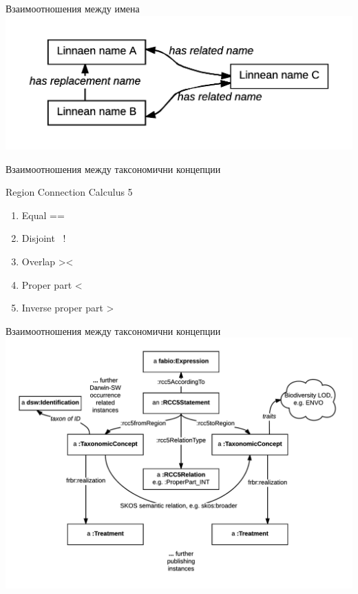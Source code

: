 \documentclass[bulgarian]{beamer}
\begin{document}
\begin{frame}{Взаимоотношения между имена}
 \centering
  \includegraphics[width=\textwidth]{Figures/scientific-name-patterns}
  \decoRule
  
\end{frame}

{

}




\begin{frame}{Взаимоотношения между таксономични концепции}

Region Connection Calculus 5
\begin{enumerate}
    \item Equal ==    
    \item Disjoint ~!
    \item Overlap   ><
    \item Proper part  <
    \item Inverse proper part >
\end{enumerate}

\end{frame}


\begin{frame}{Взаимоотношения между таксономични концепции}
\centering
  \includegraphics[width=\textwidth]{Figures/taxonomic-concept-relationships-diagram}
  \decoRule
  
\end{frame}
\end{document}
